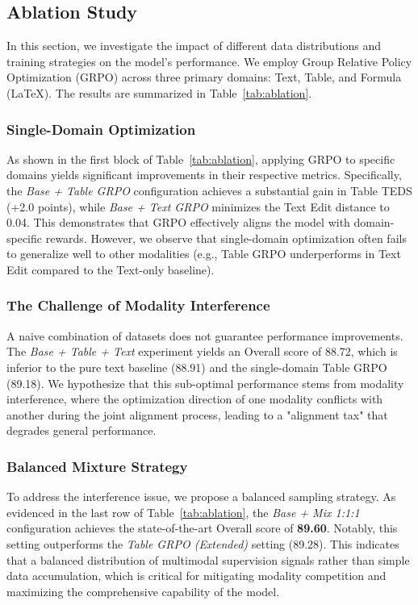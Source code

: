 \subsection{Ablation Study}

In this section, we investigate the impact of different data distributions and training strategies on the model's performance. We employ Group Relative Policy Optimization (GRPO) across three primary domains: Text, Table, and Formula (LaTeX). The results are summarized in Table~\ref{tab:ablation}.

\subsubsection{Single-Domain Optimization}
As shown in the first block of Table~\ref{tab:ablation}, applying GRPO to specific domains yields significant improvements in their respective metrics. Specifically, the \textit{Base + Table GRPO} configuration achieves a substantial gain in Table TEDS (+2.0 points), while \textit{Base + Text GRPO} minimizes the Text Edit distance to 0.04. This demonstrates that GRPO effectively aligns the model with domain-specific rewards. However, we observe that single-domain optimization often fails to generalize well to other modalities (e.g., Table GRPO underperforms in Text Edit compared to the Text-only baseline).

\subsubsection{The Challenge of Modality Interference}
A naive combination of datasets does not guarantee performance improvements. The \textit{Base + Table + Text} experiment yields an Overall score of 88.72, which is inferior to the pure text baseline (88.91) and the single-domain Table GRPO (89.18). We hypothesize that this sub-optimal performance stems from modality interference, where the optimization direction of one modality conflicts with another during the joint alignment process, leading to a "alignment tax" that degrades general performance.

\subsubsection{Balanced Mixture Strategy}
To address the interference issue, we propose a balanced sampling strategy. As evidenced in the last row of Table~\ref{tab:ablation}, the \textit{Base + Mix 1:1:1} configuration achieves the state-of-the-art Overall score of \textbf{89.60}. Notably, this setting outperforms the \textit{Table GRPO (Extended)} setting (89.28). This indicates that a balanced distribution of multimodal supervision signals rather than simple data accumulation, which is critical for mitigating modality competition and maximizing the comprehensive capability of the model.

